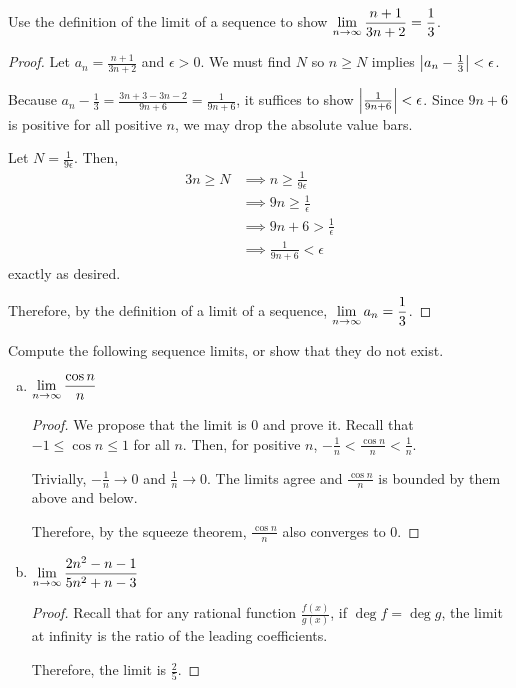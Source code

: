 
\question Use the \epsdel[N] definition of the limit of a sequence to show $\displaystyle\lim_{n\to\infty} \frac{n+1}{3n+2}=\frac13$.
\begin{proof}
  Let $a_n=\frac{n+1}{3n+2}$ and $\epsilon > 0$.
  We must find $N$ so $n \geq N$ implies $\abs{a_n-\frac13}<\epsilon$.

  Because $a_n-\frac13=\frac{3n+3-3n-2}{9n+6}=\frac{1}{9n+6}$, it suffices to show $\abs{\frac1{9n+6}}<\epsilon$.
  Since $9n+6$ is positive for all positive $n$, we may drop the absolute value bars.

  Let $N = \frac{1}{9\epsilon}$. Then,
  \begin{alignat*}{3}
    n \geq N & \implies n \geq \frac{1}{9\epsilon} \\
             & \implies 9n \geq \frac{1}{\epsilon} \\
             & \implies 9n+6 > \frac{1}{\epsilon}  \\
             & \implies \frac{1}{9n+6} < \epsilon
  \end{alignat*}
  exactly as desired.

  Therefore, by the \epsdel[N] definition of a limit of a sequence, $\displaystyle\lim_{n\to\infty}a_n=\frac13$.
\end{proof}


\question Compute the following sequence limits, or show that they do not exist.
\begin{enumerate}[(a)]
  \item $\displaystyle\lim_{n\to\infty} \frac{\cos n}{n}$
        \begin{proof}
          We propose that the limit is 0 and prove it.
          Recall that $-1 \leq \cos n \leq 1$ for all $n$.
          Then, for positive $n$, $-\frac1n < \frac{\cos n}{n} < \frac1n$.

          Trivially, $-\frac1n \to 0$ and $\frac1n \to 0$.
          The limits agree and $\frac{\cos n}{n}$ is bounded by them above and below.

          Therefore, by the squeeze theorem, $\frac{\cos n}{n}$ also converges to 0.
        \end{proof}
  \item $\displaystyle\lim_{n\to\infty} \frac{2n^2-n-1}{5n^2+n-3}$
        \begin{proof}
          Recall that for any rational function $\frac{f(x)}{g(x)}$, if $\deg f=\deg g$, the limit at infinity is the ratio of the leading coefficients.

          Therefore, the limit is $\frac{2}{5}$.
        \end{proof}
\end{enumerate}


